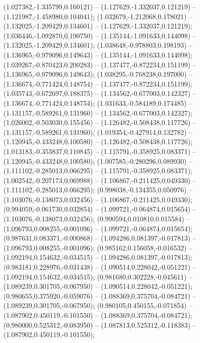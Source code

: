  (1.027382,-1.335799,0.160121) -- (1.127629,-1.332037,0.121219) -- (1.121987,-1.458980,0.104041);
 (1.032679,-1.212068,0.178021) -- (1.132025,-1.209429,0.134601) -- (1.127629,-1.332037,0.121219);
 (1.036446,-1.092870,0.190750) -- (1.135144,-1.091633,0.144098) -- (1.132025,-1.209429,0.134601);
 (1.038648,-0.978803,0.198193) -- (1.136965,-0.979096,0.149643) -- (1.135144,-1.091633,0.144098);
 (1.039267,-0.870423,0.200283) -- (1.137477,-0.872234,0.151199) -- (1.136965,-0.979096,0.149643);
 (1.038295,-0.768238,0.197000) -- (1.136674,-0.771424,0.148754) -- (1.137477,-0.872234,0.151199);
 (1.035743,-0.672697,0.188375) -- (1.134562,-0.677003,0.142327) -- (1.136674,-0.771424,0.148754);
 (1.031633,-0.584189,0.174485) -- (1.131157,-0.589261,0.131960) -- (1.134562,-0.677003,0.142327);
 (1.026002,-0.503030,0.155456) -- (1.126482,-0.508438,0.117726) -- (1.131157,-0.589261,0.131960);
 (1.019354,-0.427914,0.132782) -- (1.120945,-0.433248,0.100580) -- (1.126482,-0.508438,0.117726);
 (1.013183,-0.353837,0.110845) -- (1.115791,-0.358925,0.083371) -- (1.120945,-0.433248,0.100580);
 (1.007585,-0.280296,0.089930) -- (1.111102,-0.285013,0.066295) -- (1.115791,-0.358925,0.083371);
 (1.002542,-0.207173,0.069988) -- (1.106867,-0.211425,0.049330) -- (1.111102,-0.285013,0.066295);
 (0.998038,-0.134355,0.050976) -- (1.103076,-0.138073,0.032456) -- (1.106867,-0.211425,0.049330);
 (0.994059,-0.061730,0.032854) -- (1.099721,-0.064874,0.015654) -- (1.103076,-0.138073,0.032456);
 (0.990594,0.010810,0.015584) -- (1.096793,0.008255,-0.001096) -- (1.099721,-0.064874,0.015654);
 (0.987631,0.083371,-0.000868) -- (1.094286,0.081397,-0.017813) -- (1.096793,0.008255,-0.001096);
 (0.985162,0.156058,-0.016532) -- (1.092194,0.154632,-0.034515) -- (1.094286,0.081397,-0.017813);
 (0.983181,0.228976,-0.031438) -- (1.090514,0.228042,-0.051221) -- (1.092194,0.154632,-0.034515);
 (0.981680,0.302228,-0.045611) -- (1.089239,0.301705,-0.067950) -- (1.090514,0.228042,-0.051221);
 (0.980655,0.375920,-0.059076) -- (1.088369,0.375704,-0.084721) -- (1.089239,0.301705,-0.067950);
 (0.980105,0.450155,-0.071854) -- (1.087902,0.450119,-0.101550) -- (1.088369,0.375704,-0.084721);
 (0.980000,0.525312,-0.083950) -- (1.087813,0.525312,-0.118383) -- (1.087902,0.450119,-0.101550);
